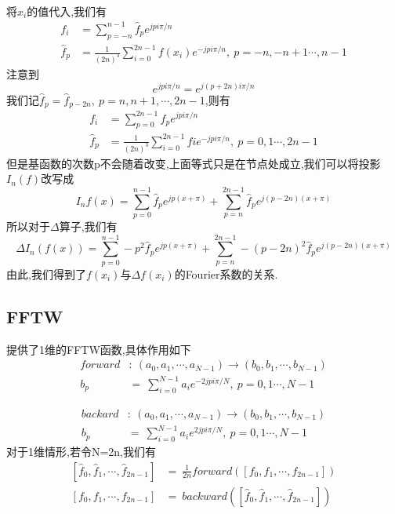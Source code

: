 \documentclass[UTF8]{ctexart}
\begin{document}
\paragraph{}
将$x_i$的值代入,我们有
\begin{equation}
 \begin{split}
 f_i &= \sum\limits_{p=-n}^{n-1}\hat{f}_p e^{jpi\pi/n}     \\
  \hat{f}_p &= \frac{1}{(2n)^3} \sum\limits_{i=0}^{2n-1}f(x_{i})e^{-jpi\pi/n} ,\ p=-n,-n+1\cdots,n-1
 \end{split}
\end{equation}
注意到
$$
e^{jpi\pi/n}=e^{j(p+2n)i\pi/n}
$$
我们记$\hat{f}_p=\hat{f}_{p-2n},\ p=n,n+1,\cdots,2n-1$,则有
\begin{equation}
 \begin{split}
 f_i &= \sum\limits_{p=0}^{2n-1}\hat{f}_p e^{jpi\pi/n}     \\
  \hat{f}_p &= \frac{1}{(2n)^3} \sum\limits_{i=0}^{2n-1}f{i}e^{-jpi\pi/n}  ,\ p=0,1\cdots,2n-1
 \end{split}
\end{equation}
但是基函数的次数p不会随着改变,上面等式只是在节点处成立,我们可以将投影$I_n(f)$改写成
$$
I_nf(x) =  \sum\limits_{p=0}^{n-1}\hat{f}_p e^{jp(x+\pi)} + \sum\limits_{p=n}^{2n-1}\hat{f}_p e^{j(p-2n)(x+\pi)}
$$
所以对于$\Delta$算子,我们有
$$
\Delta I_n(f(x)) =  \sum\limits_{p=0}^{n-1}-p^2\hat{f}_p e^{jp(x+\pi)} + \sum\limits_{p=n}^{2n-1}-(p-2n)^2\hat{f}_p e^{j(p-2n)(x+\pi)}
$$
由此,我们得到了$f(x_i)$与$\Delta f(x_i)$的Fourier系数的关系.
\subsection{FFTW}
提供了1维的FFTW函数,具体作用如下
\begin{equation}
 \begin{split}
 forward & : \   (a_0,a_1,\cdots,a_{N-1}) \rightarrow (b_0,b_1,\cdots,b_{N-1})     \\
  b_p &=\  \sum\limits_{i=0}^{N-1}a_ie^{-2jpi\pi/N}  ,\ p=0,1\cdots,N-1
 \end{split}
\end{equation}

\begin{equation}
 \begin{split}
 backard & : \   (a_0,a_1,\cdots,a_{N-1}) \rightarrow (b_0,b_1,\cdots,b_{N-1})     \\
  b_p &=\  \sum\limits_{i=0}^{N-1}a_ie^{2jpi\pi/N}  ,\ p=0,1\cdots,N-1
 \end{split}
\end{equation}
对于1维情形,若令N=2n,我们有
\begin{equation}
 \begin{split}
 [\hat{f}_0,\hat{f}_1,\cdots,\hat{f}_{2n-1}] & = \  \frac{1}{2n}  forward( [f_0,f_1,\cdots,f_{2n-1}] )  \\
  [f_0,f_1,\cdots,f_{2n-1}] &=\ backward( [\hat{f}_0,\hat{f}_1,\cdots,\hat{f}_{2n-1}] )
 \end{split}
\end{equation}
\end{document}
